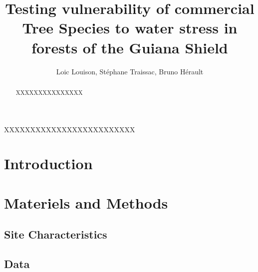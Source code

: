 \documentclass[review]{elsarticle}
\begin{document}
\begin{frontmatter}

\title{Testing vulnerability of commercial Tree Species to water stress in forests of the Guiana Shield}

\author{Loic Louison, Stéphane Traissac, Bruno Hérault}



\begin{abstract}
XXXXXXXXXXXXXXX
\end{abstract}

\begin{keyword}
XXXXXXXXXXXXXXXXXXXXXXXXX
\end{keyword}

\end{frontmatter}

\linenumbers 



%
%
%
%
%
%
%
%
%
%
%
%
%




\section{Introduction}\label{section_un}

 

%
%
%
%
%
%
%
%
%
%
%
%
%




\section{Materiels and Methods}\label{section_deux}  

\subsection{Site Characteristics}

\subsection{Data} 
\end{document}
